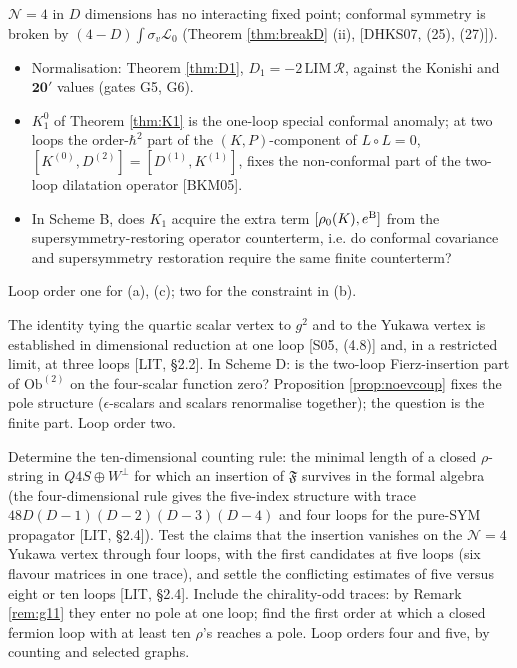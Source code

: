 \begin{problem}
\label{q:Q4}
$\mathcal N=4$ in $D$ dimensions has no interacting fixed point; conformal symmetry is broken by $(4-D)\int\sigma_v\mathscr L_0$ (Theorem \ref{thm:breakD} (ii), [DHKS07, (25), (27)]).
\begin{itemize}
\item[(a)] Normalisation: Theorem \ref{thm:D1}, $D_1=-2\,\mathrm{LIM}\,\mathcal R$, against the Konishi and $\mathbf{20}'$ values (gates G5, G6).
\item[(b)] $K_1^0$ of Theorem \ref{thm:K1} is the one-loop special conformal anomaly; at two loops the order-$\hbar^2$ part of the $(K,P)$-component of $L\circ L=0$, $[K^{(0)},D^{(2)}]=[D^{(1)},K^{(1)}]$, fixes the non-conformal part of the two-loop dilatation operator [BKM05].
\item[(c)] In Scheme B, does $K_1$ acquire the extra term $[\rho_0(K),e^{\rm B}]$ from the supersymmetry-restoring operator counterterm, i.e. do conformal covariance and supersymmetry restoration require the same finite counterterm?
\end{itemize}
Loop order one for (a), (c); two for the constraint in (b).
\end{problem}

\begin{problem}
\label{q:Q5}
The identity tying the quartic scalar vertex to $g^2$ and to the Yukawa vertex is established in dimensional reduction at one loop [S05, (4.8)] and, in a restricted limit, at three loops [LIT, §2.2]. In Scheme D: is the two-loop Fierz-insertion part of $\mathrm{Ob}^{(2)}$ on the four-scalar function zero? Proposition \ref{prop:noevcoup} fixes the pole structure ($\epsilon$-scalars and scalars renormalise together); the question is the finite part. Loop order two.
\end{problem}

\begin{problem}
\label{q:Q6}
Determine the ten-dimensional counting rule: the minimal length of a closed $\rho$-string in $Q4S\oplus W^\perp$ for which an insertion of $\mathfrak F$ survives in the formal algebra (the four-dimensional rule gives the five-index structure with trace $48D(D-1)(D-2)(D-3)(D-4)$ and four loops for the pure-SYM propagator [LIT, §2.4]). Test the claims that the insertion vanishes on the $\mathcal N=4$ Yukawa vertex through four loops, with the first candidates at five loops (six flavour matrices in one trace), and settle the conflicting estimates of five versus eight or ten loops [LIT, §2.4]. Include the chirality-odd traces: by Remark \ref{rem:g11} they enter no pole at one loop; find the first order at which a closed fermion loop with at least ten $\rho$'s reaches a pole. Loop orders four and five, by counting and selected graphs.
\end{problem}

